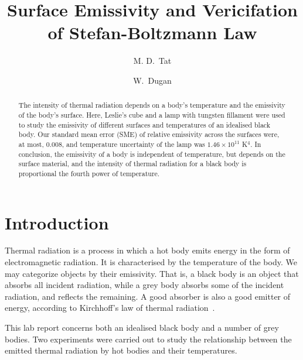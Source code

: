 \documentclass[5p,sort&compress]{elsarticle}
\begin{document}
\begin{frontmatter}

\title{Surface Emissivity and Vericifation of Stefan-Boltzmann Law}

\author[physics]{M. D.~Tat}
\author[physics]{W.~Dugan}

\address[Physics]{Institution of Physics, Norwegian University of Science and Technology, 7491 Trondheim.}

\begin{abstract}
The intensity of thermal radiation depends on a body's temperature and the emissivity of the body's surface. Here, Leslie's cube and a lamp with tungsten fillament were used to study the emissivity of different surfaces and temperatures of an idealised black body. Our standard mean error (SME) of relative emissivity across the surfaces were, at most, $0.008$, and temperature uncertainty of the lamp was $1.46\times10^{11}$ K$^4$. In conclusion, the emissivity of a body is independent of temperature, but depends on the surface material, and the intensity of thermal radiation for a black body is proportional the fourth power of temperature.


\end{abstract}
\end{frontmatter}

\section{Introduction}

Thermal radiation is a process in which a hot body emits energy in the form of electromagnetic radiation. It is characterised by the temperature of the body. We may categorize objects by their emissivity. That is, a black body is an object that absorbs all incident radiation, while a grey body absorbs some of the incident radiation, and reflects the remaining. A good absorber is also a good emitter of energy, according to Kirchhoff's law of thermal radiation~\cite{britannica}.

This lab report concerns both an idealised black body and a number of grey bodies. Two experiments were carried out to study the relationship between the emitted thermal radiation by hot bodies and their temperatures. 
\end{document}
